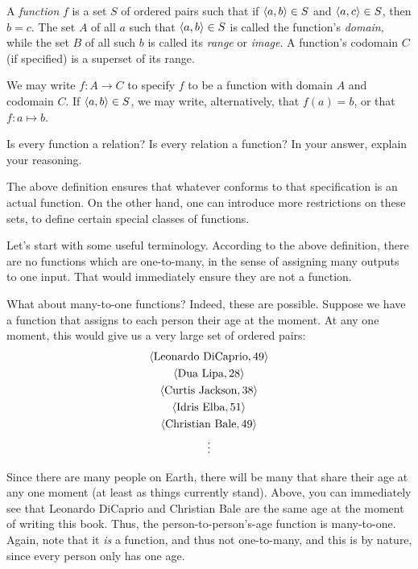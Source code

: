 \begin{defn}[Function] A \emph{function} $f$ is a set $S$ of ordered pairs such that if $\langle a,b\rangle \in S$ and $\langle a, c\rangle \in S$, then $b=c$. The set $A$ of all $a$ such that $\langle a, b\rangle \in S$ is called the function's \emph{domain}, while the set $B$ of all such $b$ is called its \emph{range} or \emph{image}. A function's codomain $C$ (if specified) is a superset of its range. 
	
We may write $f: A \to C$ to specify $f$ to be a function with domain $A$ and codomain $C$. If $\langle a, b\rangle \in S$, we may write, alternatively, that $f(a)=b$, or that $f: a \mapsto b$.   
\end{defn}

\begin{exc}
Is every function a relation? Is every relation a function? In your answer, explain your reasoning. 
\end{exc}


The above definition ensures that whatever conforms to that specification is an actual function. On the other hand, one can introduce more restrictions on these sets, to define certain special classes of functions. 

Let's start with some useful terminology. According to the above definition, there are no functions which are one-to-many, in the sense of assigning many outputs to one input. That would immediately ensure they are not a function. 

What about many-to-one functions? Indeed, these are possible. Suppose we have a function that assigns to each person their age at the moment. At any one moment, this would give us a very large set of ordered pairs:
\begin{gather*}
	\langle\text{Leonardo DiCaprio}, 49\rangle\\
	\langle\text{Dua Lipa}, 28\rangle\\
	\langle\text{Curtis Jackson}, 38\rangle\\
	\langle\text{Idris Elba}, 51\rangle\\
	\langle\text{Christian Bale}, 49\rangle\\
	\vdots
\end{gather*}

Since there are many people on Earth, there will be many that share their age at any one moment (at least as things currently stand). Above, you can immediately see that Leonardo DiCaprio and Christian Bale are the same age at the moment of writing this book. Thus, the person-to-person's-age function is many-to-one. Again, note that it \textit{is} a function, and thus not one-to-many, and this is by nature, since every person only has one age.

